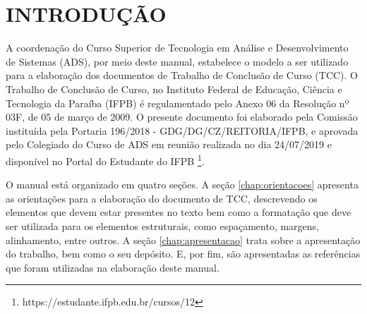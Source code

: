 %
%
\chapter{INTRODUÇÃO}\label{chap:introducao}

A coordenação do Curso Superior de Tecnologia em Análise e Desenvolvimento de Sistemas (ADS), por meio deste manual, estabelece o modelo a ser utilizado para a elaboração dos documentos de Trabalho de Conclusão de Curso (TCC). O Trabalho de Conclusão de Curso, no Instituto Federal de Educação, Ciência e Tecnologia da Paraíba (IFPB) é regulamentado pelo Anexo 06 da Resolução nº 03F, de 05 de março de 2009. O presente documento foi elaborado pela Comissão instituída pela Portaria 196/2018 - GDG/DG/CZ/REITORIA/IFPB, e aprovada pelo Colegiado do Curso de ADS em reunião realizada no dia 24/07/2019 e disponível no Portal do Estudante do IFPB \footnote{https://estudante.ifpb.edu.br/cursos/12}.

O manual está organizado em quatro seções. A seção \ref{chap:orientacoes} apresenta as orientações para a elaboração do documento de TCC, descrevendo os elementos que devem estar presentes no texto bem como a formatação que deve ser utilizada para os elementos estruturais, como espaçamento, margens, alinhamento, entre outros. A seção \ref{chap:apresentacao} trata sobre a apresentação do trabalho, bem como o seu depósito. E, por fim, são apresentadas as referências que foram utilizadas na elaboração deste manual.